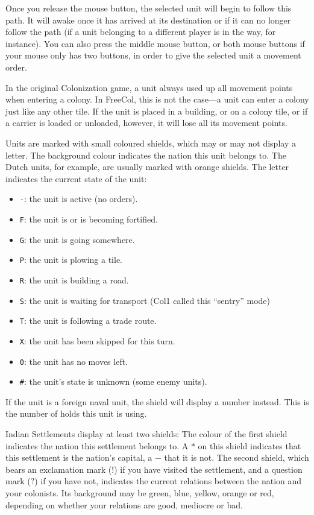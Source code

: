 \documentclass[12pt]{book}
\begin{document}
Once you release the mouse button, the selected unit will begin to
follow this path. It will awake once it has arrived at its destination
or if it can no longer follow the path (if a unit belonging to a
different player is in the way, for instance). You can also press the
middle mouse button, or both mouse buttons if your mouse only has two
buttons, in order to give the selected unit a movement order.

In the original Colonization game, a unit always used up all movement
points when entering a colony. In FreeCol, this is not the case---a
unit can enter a colony just like any other tile. If the unit is
placed in a building, or on a colony tile, or if a carrier is loaded
or unloaded, however, it will lose all its movement points.

Units are marked with small coloured shields, which may or may not
display a letter. The background colour indicates the nation this unit
belongs to. The Dutch units, for example, are usually marked with
orange shields. The letter indicates the current state of the unit:

\pagebreak[2]
\begin{itemize}
\item\verb$-$: the unit is active (no orders).
\item\verb$F$: the unit is or is becoming fortified.
\item\verb$G$: the unit is going somewhere.
\item\verb$P$: the unit is plowing a tile.
\item\verb$R$: the unit is building a road.
\item\verb$S$: the unit is waiting for transport (Col1 called this
  ``sentry'' mode)
\item\verb$T$: the unit is following a trade route.
\item\verb$X$: the unit has been skipped for this turn.
\item\verb$0$: the unit has no moves left.
\item\verb$#$: the unit's state is unknown (some enemy units).
\end{itemize}

If the unit is a foreign naval unit, the shield will display a number
instead. This is the number of holds this unit is using.

Indian Settlements display at least two shields: The colour of the
first shield indicates the nation this settlement belongs to. A $*$ on
this shield indicates that this settlement is the nation's capital, a
$-$ that it is not. The second shield, which bears an exclamation mark
($!$) if you have visited the settlement, and a question mark ($?$) if
you have not, indicates the current relations between the nation and
your colonists. Its background may be green, blue, yellow, orange or
red, depending on whether your relations are good, mediocre or bad.
\end{document}
